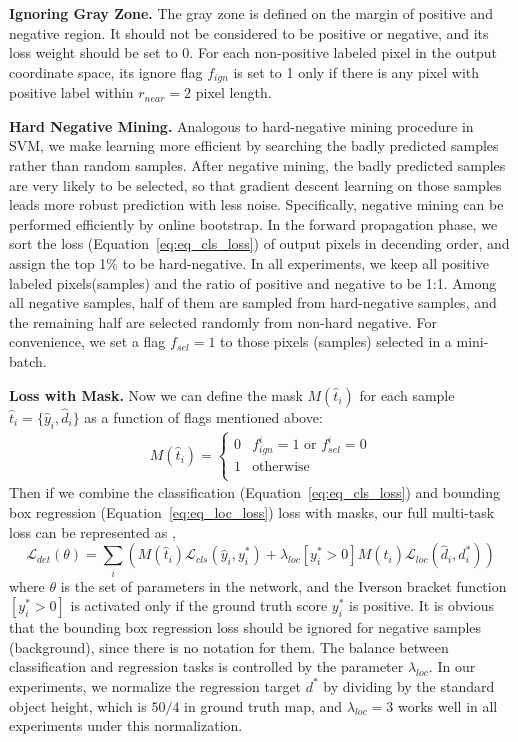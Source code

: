 \textbf{Ignoring Gray Zone.} 
The gray zone is defined on the margin of positive and negative region. It should not be considered to be positive or negative, and its loss weight should be set to $0$.  For each non-positive labeled pixel in the output coordinate space, its ignore flag $f_{ign}$ is set to 1 only if there is any pixel with positive label within $r_{near} = 2$ pixel length.  

\textbf{Hard Negative Mining.} 
Analogous to hard-negative mining procedure in SVM, we make learning more efficient by searching the badly predicted samples rather than random samples. After negative mining, the badly predicted samples are very likely to be selected, so that gradient descent learning on those samples leads more robust prediction with less noise. Specifically, negative mining can be performed efficiently by online bootstrap. In the forward propagation phase, we sort the loss (Equation~\ref{eq:eq_cls_loss}) of output pixels in decending order, and assign the top 1\% to be hard-negative.   In all experiments, we keep all positive labeled pixels(samples) and the ratio of positive and negative to be 1:1.  Among all negative samples, half of them are sampled from hard-negative samples, and the remaining half are selected randomly from non-hard negative. For convenience, we set a flag $f_{sel} = 1$ to those pixels (samples) selected in a mini-batch. 

\textbf{Loss with Mask.} 
Now we can define the mask $M(\hat{t}_i)$ for each sample $\hat{t}_i = \{ \hat{y}_i, \hat{d}_i \}$ as a function of flags mentioned above:
	\begin{eqnarray}\label{eq:eq_mask}
	M(\hat{t}_i) =
	\begin{cases}
	0 &  f_{ign}^{i} = 1 \text{ or } f_{sel}^{i} = 0 \\
	1 & \text{otherwise} \\
	\end{cases}
	\end{eqnarray}
 Then if we combine the classification (Equation~\ref{eq:eq_cls_loss})  and bounding box regression (Equation~\ref{eq:eq_loc_loss}) loss with masks, our full multi-task loss can be represented as ,
	\begin{equation}\label{eq:eq_det_loss}
	\mathcal{L} _{det}(\theta) =  \sum_{i}  \left ( M(\hat{t}_i) \mathcal{L} _{cls}(\hat{y}_i,y^*_i) + \lambda_{loc} [y^*_i >0]M(\hat{t}_i) \mathcal{L} _{loc}(\hat{d}_i,d^*_i) \right )
	\end{equation}
where $\theta$ is the set of parameters in the network, and the Iverson bracket function $[y^*_i >0]$ is activated only if the ground truth score $y^*_i$ is positive. It is obvious that the bounding box regression loss should be ignored for negative samples (background), since there is no notation for them. The balance between classification and regression tasks is controlled by the parameter $\lambda_{loc}$. In our experiments, we normalize the regression target $d^*$ by dividing by the standard object height, which is $50/4$ in ground truth map, and $\lambda_{loc} = 3$ works well in all experiments under this normalization. 

